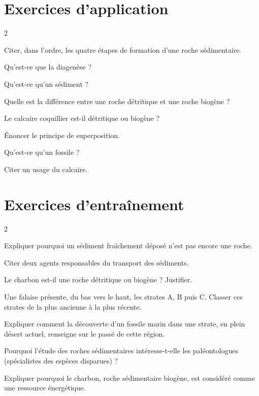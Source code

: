 \section{Exercices d'application}
\begin{multicols}{2}

\exo{} Citer, dans l'ordre, les quatre étapes de formation d'une roche
sédimentaire.

\exo{} Qu'est-ce que la diagenèse ?

\exo{} Qu'est-ce qu'un sédiment ?

\exo{} Quelle est la différence entre une roche détritique et une roche
biogène ?

\exo{} Le calcaire coquillier est-il détritique ou biogène ?

\exo{} Énoncer le principe de superposition.

\exo{} Qu'est-ce qu'un fossile ?

\exo{} Citer un usage du calcaire.

\end{multicols}

\section{Exercices d'entraînement}
\begin{multicols}{2}

\exo{} Expliquer pourquoi un sédiment fraîchement déposé n'est pas encore
une roche.

\exo{} Citer deux agents responsables du transport des sédiments.

\exo{} Le charbon est-il une roche détritique ou biogène ? Justifier.

\exo{} Une falaise présente, du bas vers le haut, les strates A, B puis C.
Classer ces strates de la plus ancienne à la plus récente.

\exo{} Expliquer comment la découverte d'un fossile marin dans une strate,
en plein désert actuel, renseigne sur le passé de cette région.

\exo{} Pourquoi l'étude des roches sédimentaires intéresse-t-elle les
paléontologues (spécialistes des espèces disparues) ?

\exo{} Expliquer pourquoi le charbon, roche sédimentaire biogène, est
considéré comme une ressource énergétique.

\end{multicols}

